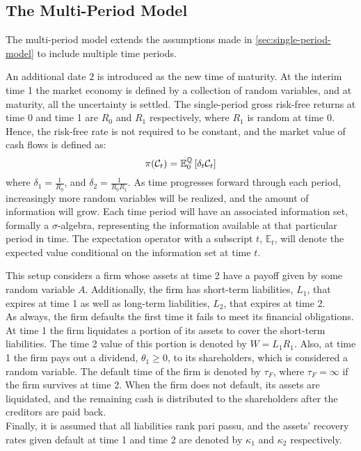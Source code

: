 \documentclass[main.tex]{subfiles}
\begin{document}
    \subsection{The Multi-Period Model}
        The multi-period model extends the assumptions made in \cref{sec:single-period-model} to include multiple time periods.

        An additional date $2$ is introduced as the new time of maturity.
        At the interim time 1 the market economy is defined by a collection of random variables,
        and at maturity, all the uncertainty is settled. 
        The single-period gross risk-free returns at time 0 and time 1 are $R_0$ and $R_1$ respectively, where $R_1$ is random at time 0.
        Hence, the risk-free rate is not required to be constant,
        and the market value of cash flows is defined as:
        \begin{equation}
            \pi(\mathcal{C}_{t}) =
            \mathbb{E}_{0}^{\mathbb{Q}}\left[\delta_t\mathcal{C}_{t}\right]
        \end{equation}
        where $\delta_1 = \frac{1}{R_0}$,
        and $\delta_2 = \frac{1}{R_{0}R_{1}}$.
        As time progresses forward through each period, 
        increasingly more random variables will be realized,
        and the amount of information will grow.
        Each time period will have an associated information set, formally a $\sigma$-algebra,
        representing the information available at that particular period in time.
        The expectation operator with a subscript $t$, $\mathbb{E}_{t}$, 
        will denote the expected value conditional on the information set at time $t$.

        This setup considers a firm whose assets at time 2 have a payoff given by some random variable $A$.
        Additionally, the firm has short-term liabilities, $L_1$, that expires at time 1 as well as long-term liabilities, $L_2$, that expires at time 2.
        \\
        As always, the firm defaults the first time it fails to meet its financial obligations.
        At time 1 the firm liquidates a portion of its assets to cover the short-term liabilities.
        The time 2 value of this portion is denoted by $W = L_1 R_1$.
        Also, at time 1 the firm pays out a dividend, $\theta_1 \geq 0$, to its shareholders,
        which is considered a random variable.
        The default time of the firm is denoted by $\tau_{F}$,
        where $\tau_{F} = \infty$ if the firm survives at time 2.
        When the firm does not default, its assets are liquidated, 
        and the remaining cash is distributed to the shareholders after the creditors are paid back.
        \\
        Finally, it is assumed that all liabilities rank pari passu,
        and the assets' recovery rates given default at time 1 and time 2 
        are denoted by $\kappa_1$ and $\kappa_2$ respectively.
\end{document}
